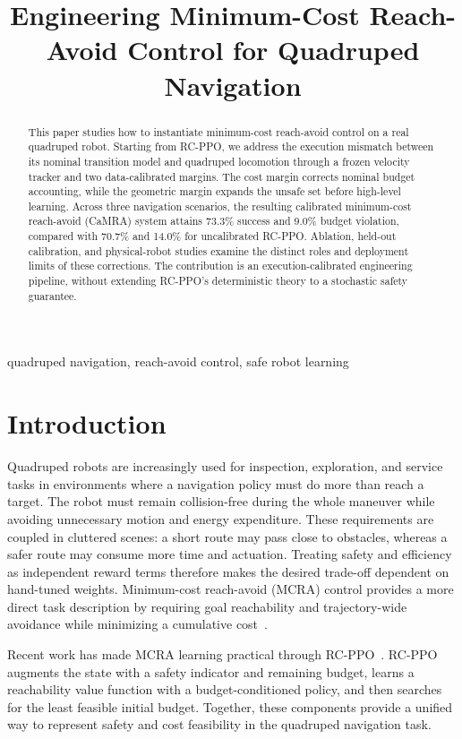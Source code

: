 \documentclass[conference]{IEEEtran}
\title{Engineering Minimum-Cost Reach-Avoid Control for Quadruped Navigation}
\author{
  \IEEEauthorblockN{Anonymous Author(s)}
  \IEEEauthorblockA{\textit{Affiliation}\\
  Address\\
  \texttt{email}}
}
\begin{document}
\raggedbottom
\maketitle

\begin{abstract}
This paper studies how to instantiate minimum-cost reach-avoid control on a real quadruped robot. Starting from RC-PPO, we address the execution mismatch between its nominal transition model and quadruped locomotion through a frozen velocity tracker and two data-calibrated margins. The cost margin corrects nominal budget accounting, while the geometric margin expands the unsafe set before high-level learning. Across three navigation scenarios, the resulting calibrated minimum-cost reach-avoid (CaMRA) system attains 73.3\% success and 9.0\% budget violation, compared with 70.7\% and 14.0\% for uncalibrated RC-PPO. Ablation, held-out calibration, and physical-robot studies examine the distinct roles and deployment limits of these corrections. The contribution is an execution-calibrated engineering pipeline, without extending RC-PPO's deterministic theory to a stochastic safety guarantee.
\end{abstract}

\begin{IEEEkeywords}
quadruped navigation, reach-avoid control, safe robot learning
\end{IEEEkeywords}

\section{Introduction}
Quadruped robots are increasingly used for inspection, exploration, and service
tasks in environments where a navigation policy must do more than reach a target.
The robot must remain collision-free during the whole maneuver while avoiding
unnecessary motion and energy expenditure. These requirements are coupled in
cluttered scenes: a short route may pass close to obstacles, whereas a safer route
may consume more time and actuation. Treating safety and efficiency as independent
reward terms therefore makes the desired trade-off dependent on hand-tuned weights.
Minimum-cost reach-avoid (MCRA) control provides a more direct task description by
requiring goal reachability and trajectory-wide avoidance while minimizing a
cumulative cost~\cite{bansal2017,ganai2024survey}.

Recent work has made MCRA learning practical through RC-PPO~\cite{so2024}.
RC-PPO augments the state with a safety indicator and remaining budget, learns a
reachability value function with a budget-conditioned policy, and then searches for
the least feasible initial budget. Together, these components provide a unified way
to represent safety and cost feasibility in the quadruped navigation task.
\end{document}
